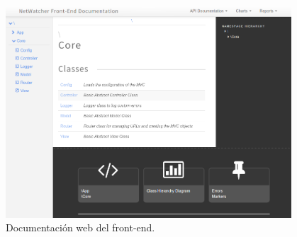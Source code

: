 \begin{figure}[!htp]
  \centering
  \includegraphics[width=0.95\textwidth,clip=true]{graphics/capturas/docs_frontend}
  \caption{Documentación web del \gls{front-end}.}
  \label{fig:captura:docsfrontend}
\end{figure}
